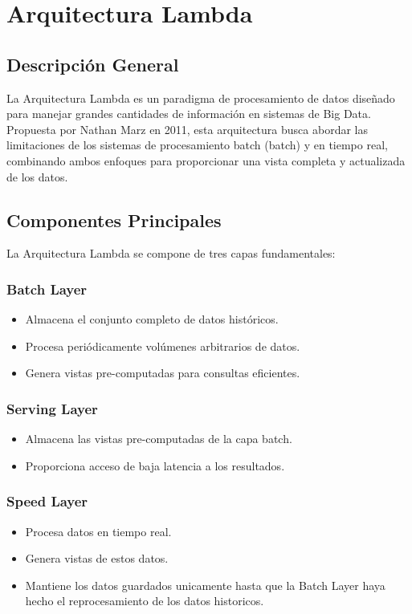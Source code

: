 \section{Arquitectura Lambda}

\subsection{Descripción General}
La Arquitectura Lambda es un paradigma de procesamiento de datos diseñado para manejar grandes cantidades de información en sistemas de Big Data. 
Propuesta por Nathan Marz en 2011, esta arquitectura busca abordar las limitaciones de los sistemas de procesamiento batch (batch) y en tiempo real, 
combinando ambos enfoques para proporcionar una vista completa y actualizada de los datos.

\subsection{Componentes Principales}
La Arquitectura Lambda se compone de tres capas fundamentales:

\subsubsection{Batch Layer}
\begin{itemize}
\item Almacena el conjunto completo de datos históricos.
\item Procesa periódicamente volúmenes arbitrarios de datos.
\item Genera vistas pre-computadas para consultas eficientes.
\end{itemize}

\subsubsection{Serving Layer}
\begin{itemize}
\item Almacena las vistas pre-computadas de la capa batch.
\item Proporciona acceso de baja latencia a los resultados.
\end{itemize}

\subsubsection{Speed Layer}
\begin{itemize}
\item Procesa datos en tiempo real.
\item Genera vistas de estos datos.
\item Mantiene los datos guardados unicamente hasta que la Batch Layer haya hecho el reprocesamiento de los datos historicos.
\end{itemize}

